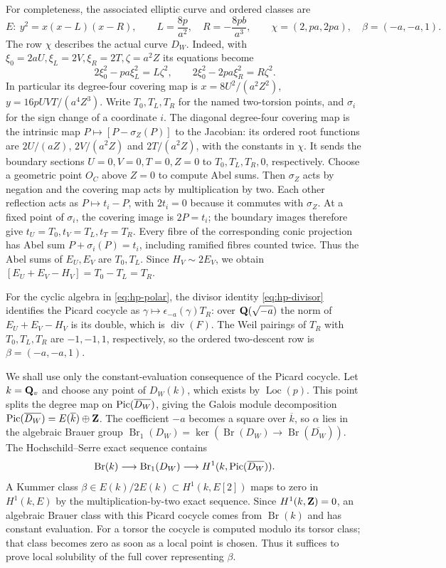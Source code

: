 For completeness, the associated elliptic curve and ordered classes are
\begin{equation}\label{eq:hp-elliptic}
 E:\ y^2=x(x-L)(x-R),\qquad
 L=\frac{8p}{a^2},\quad R=-\frac{8pb}{a^3},\qquad
 \chi=(2,pa,2pa),\quad\beta=(-a,-a,1).
\end{equation}
The row $\chi$ describes the actual curve $D_W$.  Indeed, with
$\xi_0=2aU,\xi_L=2V,\xi_R=2T,\zeta=a^2Z$ its equations become
\[
 2\xi_0^2-pa\xi_L^2=L\zeta^2,
 \qquad 2\xi_0^2-2pa\xi_R^2=R\zeta^2.
\]
In particular its degree-four covering map is
$x=8U^2/(a^2Z^2)$, $y=16pUVT/(a^4Z^3)$.
Write $T_0,T_L,T_R$ for the named two-torsion points, and
$\sigma_i$ for the sign change of a coordinate $i$.
The diagonal degree-four covering map is the intrinsic map
$P\mapsto[P-\sigma_Z(P)]$ to the Jacobian: its ordered root functions
are $2U/(aZ)$, $2V/(a^2Z)$ and $2T/(a^2Z)$, with the constants in
$\chi$.  It sends the boundary sections $U=0,V=0,T=0,Z=0$ to
$T_0,T_L,T_R,0$, respectively.
Choose a geometric point $O_C$ above $Z=0$ to compute Abel sums.
Then $\sigma_Z$ acts by negation and the covering map acts by
multiplication by two.  Each other reflection acts as
$P\mapsto t_i-P$, with $2t_i=0$ because it commutes with $\sigma_Z$.
At a fixed point of $\sigma_i$, the covering image is $2P=t_i$;
the boundary images therefore give
$t_U=T_0,t_V=T_L,t_T=T_R$.
Every fibre of the corresponding conic projection has Abel sum
$P+\sigma_i(P)=t_i$, including ramified fibres counted twice.
Thus the Abel sums of $E_U,E_V$ are $T_0,T_L$.
Since $H_V\sim2E_V$, we obtain
$[E_U+E_V-H_V]=T_0-T_L=T_R$.

For the cyclic algebra in \eqref{eq:hp-polar}, the divisor identity
\eqref{eq:hp-divisor} identifies the Picard cocycle as
$\gamma\mapsto\epsilon_{-a}(\gamma)T_R$:
over $\mathbf Q(\sqrt{-a})$ the norm of $E_U+E_V-H_V$ is its double,
which is $\operatorname{div}(F)$.
The Weil pairings of $T_R$ with $T_0,T_L,T_R$ are $-1,-1,1$,
respectively, so the ordered two-descent row is $\beta=(-a,-a,1)$.

We shall use only the constant-evaluation consequence of the Picard
cocycle.  Let $k=\mathbf Q_v$ and choose any point of $D_W(k)$, which exists
by $\operatorname{Loc}(p)$.  This point splits the degree map on
$\operatorname{Pic}(\overline{D_W})$, giving the Galois module decomposition
$\operatorname{Pic}(\overline{D_W})=E(\overline k)\oplus\mathbf Z$.
The coefficient $-a$ becomes a square over $\overline k$, so $\alpha$
lies in the algebraic Brauer group
$\operatorname{Br}_1(D_W)=\ker(\operatorname{Br}(D_W)\to
\operatorname{Br}(\overline{D_W}))$.
The Hochschild--Serre exact sequence
\cite[\S2, (2.1)]{creutz2020} contains
\[
 \operatorname{Br}(k)\longrightarrow\operatorname{Br}_1(D_W)
 \longrightarrow H^1(k,\operatorname{Pic}(\overline{D_W})).
\]
A Kummer class $\beta\in E(k)/2E(k)\subset H^1(k,E[2])$ maps to zero
in $H^1(k,E)$ by the multiplication-by-two exact sequence.  Since
$H^1(k,\mathbf Z)=0$, an algebraic Brauer class with this Picard cocycle
comes from $\operatorname{Br}(k)$ and has constant evaluation.
For a torsor the cocycle is computed modulo its torsor class; that
class becomes zero as soon as a local point is chosen.  Thus it
suffices to prove local solubility of the full cover representing
$\beta$.

